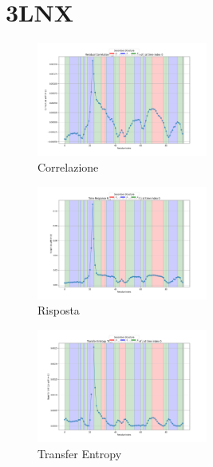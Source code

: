\documentclass{article}
\begin{document}
\section{3LNX}
\begin{figure}[h]
    \centering
    \includegraphics[width=0.5\textwidth]{images/3LNXResidual Correlation C_ij for i=22 as a function of j at time index 0.png}
    \caption{Correlazione}
\end{figure}
\begin{figure}[h]
    \centering
    \includegraphics[width=0.5\textwidth]{images/3LNXTime Response R_ij for i=22 as a function of j at time index 0.png}
    \caption{Risposta}
\end{figure}

\begin{figure}[h]
    \centering
    \includegraphics[width=0.5\textwidth]{images/3LNXTransfer Entropy TE_ij for i=22 as a function of j at time index 0.png}
    \caption{Transfer Entropy}
\end{figure}
\end{document}
